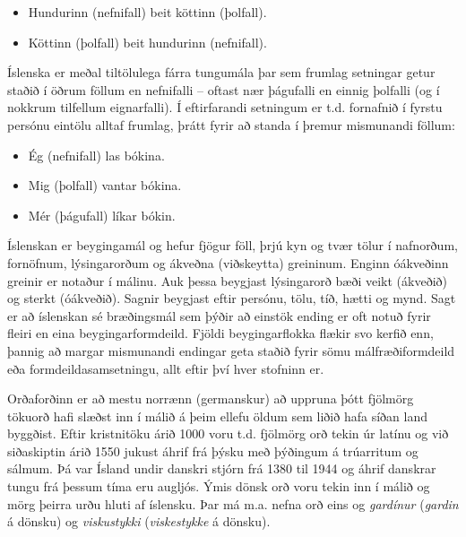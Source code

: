 \documentclass{../../metanetpaper}
\begin{document}
\begin{multicols}{2}
\begin{itemize}
\item Hundurinn (nefnifall) beit köttinn (þolfall).
\item Köttinn (þolfall) beit hundurinn (nefnifall).
\end{itemize}

Íslenska er meðal tiltölulega fárra tungumála þar sem frumlag setningar getur staðið í öðrum föllum en nefnifalli -- oftast nær þágufalli en einnig þolfalli (og í nokkrum tilfellum eignarfalli). Í eftirfarandi setningum er t.d. fornafnið í fyrstu persónu eintölu alltaf frumlag, þrátt fyrir að standa í þremur mismunandi föllum:

\begin{itemize}
\item Ég (nefnifall) las bókina.
\item Mig (þolfall) vantar bókina.
\item Mér (þágufall) líkar bókin.
\end{itemize}

Íslenskan er beygingamál og hefur fjögur föll, þrjú kyn og tvær tölur í nafnorðum, fornöfnum, lýsingarorðum og ákveðna (viðskeytta) greininum. Enginn óákveðinn greinir er notaður í málinu. Auk þessa beygjast lýsingarorð bæði veikt (ákveðið) og sterkt (óákveðið). Sagnir beygjast eftir persónu, tölu, tíð, hætti og mynd. Sagt er að íslenskan sé bræðingsmál sem þýðir að einstök ending er oft notuð fyrir fleiri en eina beygingarformdeild. Fjöldi beygingarflokka flækir svo kerfið enn, þannig að margar mismunandi endingar geta staðið fyrir sömu málfræðiformdeild eða formdeildasamsetningu, allt eftir því hver stofninn er.

Orðaforðinn er að mestu norrænn (germanskur) að uppruna þótt fjölmörg tökuorð hafi slæðst inn í málið á þeim ellefu öldum sem liðið hafa síðan land byggðist. Eftir kristnitöku árið 1000 voru t.d. fjölmörg orð tekin úr latínu og við siðaskiptin árið 1550 jukust áhrif frá þýsku með þýðingum á trúarritum og sálmum. Þá var Ísland undir danskri stjórn frá 1380 til 1944 og áhrif danskrar tungu frá þessum tíma eru augljós. Ýmis dönsk orð voru tekin inn í málið og mörg þeirra urðu hluti af íslensku. Þar má m.a. nefna orð eins og \textit{gardínur} (\textit{gardin} á dönsku) og \textit{viskustykki} (\textit{viskestykke} á dönsku).


\end{multicols}
\end{document}
